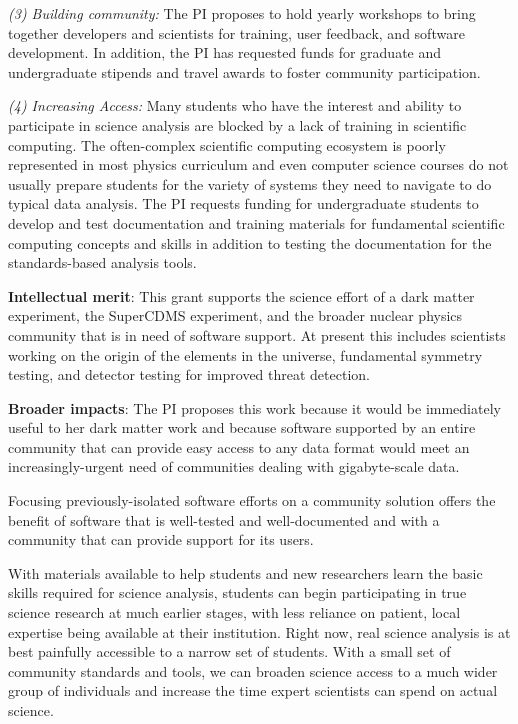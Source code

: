 {\it (3) Building community:} The PI proposes to hold yearly workshops to bring together developers and scientists for training, user feedback, and software development.  In addition, the PI has requested funds for graduate and undergraduate stipends and travel awards to foster community participation.

{\it (4) Increasing Access:} Many students who have the interest and ability to participate in science analysis are blocked by a lack of training in scientific computing.  The often-complex scientific computing ecosystem is poorly represented in most physics curriculum and even computer science courses do not usually prepare students for the variety of systems they need to navigate to do typical data analysis.  The PI requests funding for undergraduate students to develop and test documentation and training materials for fundamental scientific computing concepts and skills in addition to testing the documentation for the standards-based analysis tools.

\textbf{Intellectual merit}: This grant supports the science effort of a dark matter experiment, the SuperCDMS experiment, and the broader nuclear physics community that is in need of software support.  At present this includes scientists working on the origin of the elements in the universe, fundamental symmetry testing, and detector testing for improved threat detection.

\textbf{Broader impacts}: The PI proposes this work because it would be immediately useful to her dark matter work and because software supported by an entire community that can provide easy access to any data format would meet an increasingly-urgent need of communities dealing with gigabyte-scale data.

Focusing previously-isolated software efforts on a community solution offers the benefit of software that is well-tested and well-documented and with a community that can provide support for its users.

With materials available to help students and new researchers learn the basic skills required for science analysis, students can begin participating in true science research at much earlier stages, with less reliance on patient, local expertise being available at their institution.  Right now, real science analysis is at best painfully accessible to a narrow set of students.  With a small set of community standards and tools, we can broaden science access to a much wider group of individuals and increase the time expert scientists can spend on actual science.

